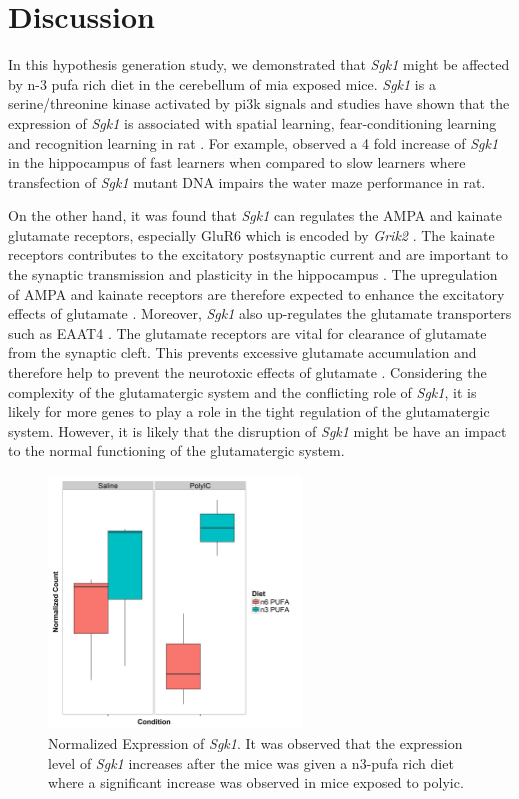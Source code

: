 \section{Discussion}
In this hypothesis generation study, we demonstrated that \textit{Sgk1} might be affected by n-3 \gls{pufa} rich diet in the cerebellum of \gls{mia} exposed mice. 
\textit{Sgk1} is a serine/threonine kinase activated by \gls{pi3k} signals and studies have shown that the expression of \textit{Sgk1} is associated with spatial learning, fear-conditioning learning and recognition learning in rat \citep{Tsai2002,Lee2003}.
For example, \citet{Tsai2002} observed a 4 fold increase of \textit{Sgk1} in the hippocampus of fast learners when compared to slow learners where transfection of \textit{Sgk1} mutant DNA impairs the water maze performance in rat.

On the other hand, it was found that \textit{Sgk1} can regulates the AMPA and kainate glutamate receptors, especially GluR6 which is encoded by \textit{Grik2} \citep{Lang2006,Lang2010}.
The kainate receptors contributes to the excitatory postsynaptic current and are important to the synaptic transmission and plasticity in the hippocampus \citep{Lang2006}.
The upregulation of AMPA and kainate receptors are therefore expected to enhance the excitatory effects of glutamate \citep{Lang2010}.
Moreover, \textit{Sgk1} also up-regulates the glutamate transporters such as EAAT4 \citep{Bohmer2004}.
The glutamate receptors are vital for clearance of glutamate from the synaptic cleft.
This prevents excessive glutamate accumulation and therefore help to prevent the neurotoxic effects of glutamate \citep{Lang2010}.
Considering the complexity of the glutamatergic system and the conflicting role of \textit{Sgk1}, it is likely for more genes to play a role in the tight regulation of the glutamatergic system.
However, it is likely that the disruption of \textit{Sgk1} might be have an impact to the normal functioning of the glutamatergic system.

\begin{figure}
	\centering
	\includegraphics[width=0.6\textwidth]{figure/omega/Sgk1_expression.png}
	\caption[Normalized Expression of \textit{Sgk1}]{
		Normalized Expression of \textit{Sgk1}.
		It was observed that the expression level of \textit{Sgk1} increases after the mice was given a n3-\gls{pufa} rich diet where a significant increase was observed in mice exposed to \gls{polyic}.
	}\label{fig:sgk1Express}
\end{figure}

